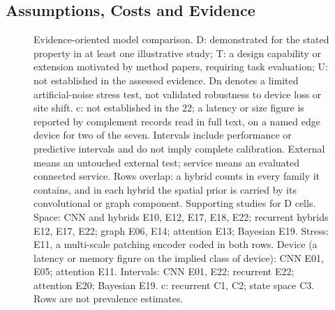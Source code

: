 \documentclass[journal]{IEEEtran}
\begin{document}
\subsection{Assumptions, Costs and Evidence}
\label{sec:tradeoffs}
\begin{figure}[t]\centering
{}
\caption{Evidence-oriented model comparison. D: demonstrated for the stated property in at least one illustrative study; T: a design capability or extension motivated by method papers, requiring task evaluation; U: not established in the assessed evidence. Dn denotes a limited artificial-noise stress test, not validated robustness to device loss or site shift. c: not established in the 22; a latency or size figure is reported by complement records read in full text, on a named edge device for two of the seven. Intervals include performance or predictive intervals and do not imply complete calibration. External means an untouched external test; service means an evaluated connected service. Rows overlap: a hybrid counts in every family it contains, and in each hybrid the spatial prior is carried by its convolutional or graph component. Supporting studies for D cells. Space: CNN and hybrids E10, E12, E17, E18, E22; recurrent hybrids E12, E17, E22; graph E06, E14; attention E13; Bayesian E19. Stress: E11, a multi-scale patching encoder coded in both rows. Device (a latency or memory figure on the implied class of device): CNN E01, E05; attention E11. Intervals: CNN E01, E22; recurrent E22; attention E20; Bayesian E19. c: recurrent C1, C2; state space C3. Rows are not prevalence estimates.}
\label{fig:heatmap}\end{figure}
\end{document}
